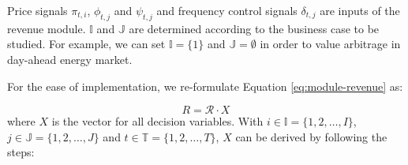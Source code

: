 Price signals $\pi_{t,i}$, $\phi_{t,j}$ and $\psi_{t,j}$ and frequency control signals $\delta_{t,j}$ are inputs of the revenue module. $\mathbb{I}$ and $\mathbb{J}$ are determined according to the business case to be studied. For example, we can set $\mathbb{I} = \{1\}$ and $ \mathbb{J}=\emptyset$ in order to value arbitrage in day-ahead energy market. 





For the ease of implementation, we re-formulate Equation \eqref{eq:module-revenue} as:

\begin{equation}
\label{eq:revnue-matrix}
R = \mathcal{R} \cdot X 
\end{equation}
where $X$ is the vector for all decision variables. %
With $i \in \mathbb{I} = \{1,2,\dots,I\}$,
$j \in \mathbb{J} = \{1,2,\dots,J\}$ and
$t \in \mathbb{T} = \{1,2,\dots,T\}$, $X$ can be derived by following the steps:

